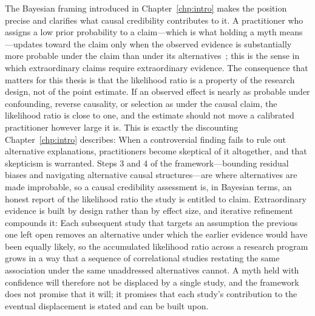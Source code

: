 The Bayesian framing introduced in Chapter~\ref{chp:intro} makes the position precise and clarifies what causal credibility contributes to it.
A practitioner who assigns a low prior probability to a claim---which is what holding a myth means---updates toward the claim only when the observed evidence is substantially more probable under the claim than under its alternatives~\cite{howson2006scientific}; this is the sense in which extraordinary claims require extraordinary evidence.
The consequence that matters for this thesis is that the likelihood ratio is a property of the research design, not of the point estimate.
If an observed effect is nearly as probable under confounding, reverse causality, or selection as under the causal claim, the likelihood ratio is close to one, and the estimate should not move a calibrated practitioner however large it is.
This is exactly the discounting Chapter~\ref{chp:intro} describes: When a controversial finding fails to rule out alternative explanations, practitioners become skeptical of it altogether, and that skepticism is warranted.
Steps 3 and 4 of the framework---bounding residual biases and navigating alternative causal structures---are where alternatives are made improbable, so a causal credibility assessment is, in Bayesian terms, an honest report of the likelihood ratio the study is entitled to claim.
Extraordinary evidence is built by design rather than by effect size, and iterative refinement compounds it: Each subsequent study that targets an assumption the previous one left open removes an alternative under which the earlier evidence would have been equally likely, so the accumulated likelihood ratio across a research program grows in a way that a sequence of correlational studies restating the same association under the same unaddressed alternatives cannot.
A myth held with confidence will therefore not be displaced by a single study, and the framework does not promise that it will; it promises that each study's contribution to the eventual displacement is stated and can be built upon.

